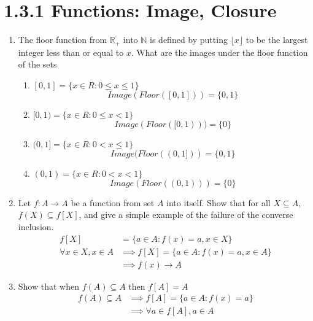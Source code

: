 \documentclass{article}
\begin{document}
\section*{1.3.1 Functions: Image, Closure}
\begin{enumerate}
    \item The floor function from $\mathbb{R}_{+}$ into $\mathbb{N}$ is defined by putting $\lfloor{x}\rfloor$ to be the largest integer less than or equal to $x$. What are the images under the floor function of the sets
    \begin{enumerate}
        \item $[0, 1] = \{x \in R: 0 \leq x \leq 1 \}$
        \begin{equation*}
            Image(Floor([0, 1])) = \{0, 1\}
        \end{equation*}
        \item $[0, 1) = \{x \in R: 0 \leq x < 1 \}$
        \begin{equation*}
            Image(Floor([0, 1))) = \{0\}
        \end{equation*}
        \item $(0, 1] = \{x \in R: 0 < x \leq 1 \}$
        \begin{equation*}
            Image(Floor((0, 1])) = \{0, 1\}
        \end{equation*}
        \item $(0, 1) = \{x \in R: 0 < x < 1 \}$
        \begin{equation*}
            Image(Floor((0, 1))) = \{0\}
        \end{equation*}
    \end{enumerate}
    \item Let $f : A\rightarrow A$ be a function from set $A$ into itself. Show that for all $X \subseteq A$, $f(X) \subseteq f[X]$, and give a simple example of the failure of the converse inclusion.
    \begin{align*}
        f[X] &= \{a \in A: f(x) = a, x \in X\}\\
        \forall x\in X, x \in A &\implies f[X] = \{a \in A: f(x) = a, x \in A\}\\
        &\implies f(x) \rightarrow A
    \end{align*}
    \item Show that when $f(A) \subseteq A$ then $f[A] = A$
    \begin{align*}
        f(A) \subseteq A &\implies  f[A] = \{a \in A: f(x) = a\}\\
        &\implies \forall a \in f[A], a \in A 

\end{align*}
\end{enumerate}
\end{document}
